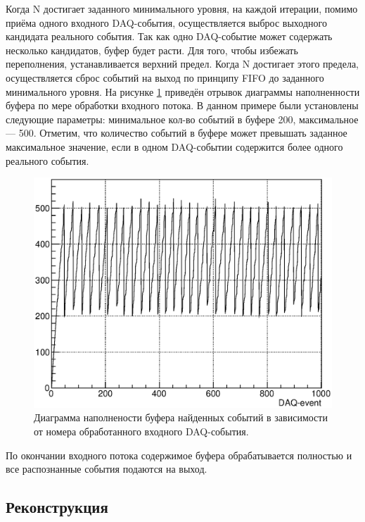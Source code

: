 Когда N достигает заданного минимального уровня, на каждой итерации, помимо приёма одного входного DAQ-события, осуществляется выброс выходного кандидата реального события. Так как одно DAQ-событие может содержать несколько кандидатов, буфер будет расти. Для того, чтобы избежать переполнения, устанавливается верхний предел. Когда N достигает этого предела, осуществляется сброс событий на выход по принципу FIFO до заданного минимального уровня. На рисунке \ref{fig:Buffer} приведён отрывок диаграммы наполненности буфера по мере обработки входного потока. В данном примере были установлены следующие параметры: минимальное кол-во событий в буфере 200, максимальное --- 500. Отметим, что количество событий в буфере может превышать заданное максимальное значение, если в одном DAQ-событии содержится более одного реального события.


\begin{figure}
\includegraphics[width=1.0\textwidth]{pictures/16_Buff.eps}
\caption{Диаграмма наполнености буфера найденных событий в зависимости от номера обработанного входного DAQ-события.}
\label{fig:Buffer}
\end{figure}

По окончании входного потока содержимое буфера обрабатывается полностью и все распознанные события подаются на выход.

\subsection{Реконструкция}

